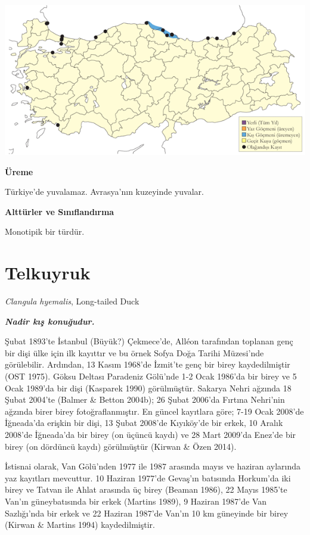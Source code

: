 \documentclass[
  letterpaper,
  DIV=11,
  numbers=noendperiod]{scrreprt}
\begin{document}
\includegraphics{images/harita_Page_029.png}

\textbf{Üreme}

Türkiye'de yuvalamaz. Avrasya'nın kuzeyinde yuvalar.

\textbf{Alttürler ve Sınıflandırma}

Monotipik bir türdür.

\section{Telkuyruk}\label{telkuyruk}

\emph{Clangula hyemalis}, Long-tailed Duck

\textbf{\emph{Nadir kış konuğudur.}}

Şubat 1893'te İstanbul (Büyük?) Çekmece'de, Alléon tarafından toplanan
genç bir dişi ülke için ilk kayıttır ve bu örnek Sofya Doğa Tarihi
Müzesi'nde görülebilir. Ardından, 13 Kasım 1968'de İzmit'te genç bir
birey kaydedilmiştir (OST 1975). Göksu Deltası Paradeniz Gölü'nde 1-2
Ocak 1986'da bir birey ve 5 Ocak 1989'da bir dişi (Kasparek 1990)
görülmüştür. Sakarya Nehri ağzında 18 Şubat 2004'te (Balmer \& Betton
2004b); 26 Şubat 2006'da Fırtına Nehri'nin ağzında birer birey
fotoğraflanmıştır. En güncel kayıtlara göre; 7-19 Ocak 2008'de
İğneada'da erişkin bir dişi, 13 Şubat 2008'de Kıyıköy'de bir erkek, 10
Aralık 2008'de İğneada'da bir birey (on üçüncü kaydı) ve 28 Mart 2009'da
Enez'de bir birey (on dördüncü kaydı) görülmüştür (Kirwan \& Özen 2014).

İstisnai olarak, Van Gölü'nden 1977 ile 1987 arasında mayıs ve haziran
aylarında yaz kayıtları mevcuttur. 10 Haziran 1977'de Gevaş'ın batısında
Horkum'da iki birey ve Tatvan ile Ahlat arasında üç birey (Beaman 1986),
22 Mayıs 1985'te Van'ın güneybatısında bir erkek (Martins 1989), 9
Haziran 1987'de Van Sazlığı'nda bir erkek ve 22 Haziran 1987'de Van'ın
10 km güneyinde bir birey (Kirwan \& Martins 1994) kaydedilmiştir.
\end{document}

